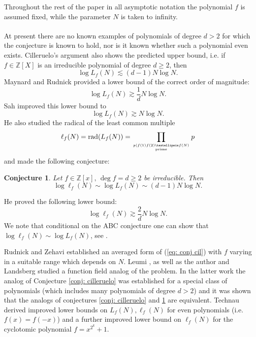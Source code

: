 \documentclass[alphabetic]{amsart}
\newtheorem{conj}[claim]{Conjecture}
\theoremstyle{definition}
\numberwithin{equation}{section}
\newcommand{\Z}{{\mathbb Z}}
\numberwithin{equation}{section}
\begin{document}
 Throughout the rest of the paper in all asymptotic notation the polynomial $f$ is assumed fixed, while the parameter $N$ is taken to infinity.
\\ \\
At present there are no known examples of polynomials of degree $d > 2$ for which the conjecture is known to hold, nor is it known whether such a polynomial even exists. Cilleruelo's argument also shows the predicted upper bound, i.e. if $f \in \mathbb{Z}[X]$ is an irreducible polynomial of degree $d \geq 2$, then
$$\log L_f(N)\lesssim (d-1)N\log N.$$
Maynard and Rudnick \cite{MaRu21} provided a lower bound of the correct order of magnitude:
\begin{equation}\label{eq:sah_lower_bound}\log L_f(N) \gtrsim \frac{1}{d} N \log N.\end{equation}
Sah \cite{Sah20} improved this lower bound to
\begin{equation}\label{eq: sah lower bound L}\log L_f(N)\gtrsim N\log N.\end{equation} He also studied the radical of the least common multiple
$$\ell_f(N)=\mathrm{rad}(L_f(N))=\prod_{p|f(1)f(2)\ldots f(N)\atop{\mathrm{prime}}}p$$ and made the following conjecture:

\begin{conj}\label{conj: sah}Let $f\in\Z[x],\,\deg f=d\ge 2$ be irreducible. Then $$\log\ell_f(N)\sim\log L_f(N)\sim (d-1)N\log N.$$\end{conj}
He proved the following lower bound:
\begin{equation}\label{eq: sah lower bound l}\log \ell_f(N) \gtrsim \frac 2d N \log N.\end{equation}
 We note that conditional on the ABC conjecture one can show that $\log\ell_f(N)\sim\log L_f(N)$, see \cite[Remark 6.2]{EnLa23_2}. 

Rudnick and Zehavi \cite{RuZe20} established an averaged form of (\ref{eq: conj cil}) with $f$ varying in a suitable range which depends on $N$.  Leumi \cite{Leu21_}, as well as the author and Landsberg \cite{EnLa23_2} studied a function field analog of the problem. In the latter work the analog of Conjecture \ref{conj: cilleruelo} was established for a special class of polynomials (which includes many polynomials of degree $d>2$) and it was shown that the analogs of conjectures \ref{conj: cilleruelo} and \ref{conj: sah} are equivalent. Technau \cite{Tec24_1} derived improved lower bounds on $L_f(N),\ell_f(N)$ for even polynomials (i.e. $f(x)=f(-x)$) and a further improved lower bound on $\ell_f(N)$ for the cyclotomic polynomial $f=x^{2^k}+1$.
\end{document}
